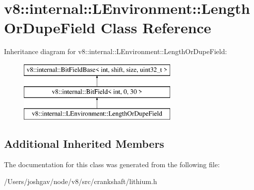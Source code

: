 \hypertarget{classv8_1_1internal_1_1_l_environment_1_1_length_or_dupe_field}{}\section{v8\+:\+:internal\+:\+:L\+Environment\+:\+:Length\+Or\+Dupe\+Field Class Reference}
\label{classv8_1_1internal_1_1_l_environment_1_1_length_or_dupe_field}
Inheritance diagram for v8\+:\+:internal\+:\+:L\+Environment\+:\+:Length\+Or\+Dupe\+Field\+:\begin{figure}[H]
\begin{center}
\leavevmode
\includegraphics[height=3.000000cm]{classv8_1_1internal_1_1_l_environment_1_1_length_or_dupe_field}
\end{center}
\end{figure}
\subsection*{Additional Inherited Members}


The documentation for this class was generated from the following file\+:\begin{DoxyCompactItemize}
\item 
/\+Users/joshgav/node/v8/src/crankshaft/lithium.\+h\end{DoxyCompactItemize}
